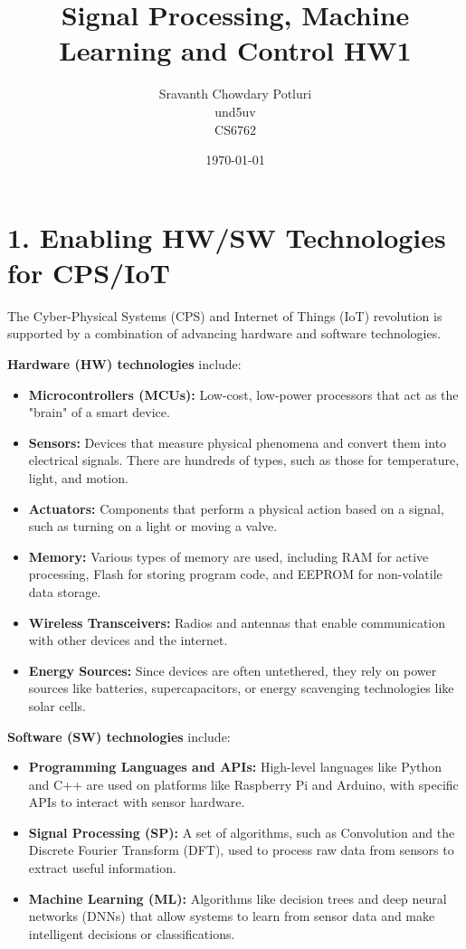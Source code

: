 \documentclass[a4paper,12pt]{article}
\title{Signal Processing, Machine Learning and Control HW1}
\author{Sravanth Chowdary Potluri \\ und5uv \\ CS6762}
\date{\today}
\begin{document}
\maketitle

\section*{1. Enabling HW/SW Technologies for CPS/IoT}

The Cyber-Physical Systems (CPS) and Internet of Things (IoT) revolution is supported by a combination of advancing hardware and software technologies. 

\textbf{Hardware (HW) technologies} include:
\begin{itemize}
    \item \textbf{Microcontrollers (MCUs):} Low-cost, low-power processors that act as the "brain" of a smart device.
    \item \textbf{Sensors:} Devices that measure physical phenomena and convert them into electrical signals. There are hundreds of types, such as those for temperature, light, and motion.
    \item \textbf{Actuators:} Components that perform a physical action based on a signal, such as turning on a light or moving a valve.
    \item \textbf{Memory:} Various types of memory are used, including RAM for active processing, Flash for storing program code, and EEPROM for non-volatile data storage.
    \item \textbf{Wireless Transceivers:} Radios and antennas that enable communication with other devices and the internet.
    \item \textbf{Energy Sources:} Since devices are often untethered, they rely on power sources like batteries, supercapacitors, or energy scavenging technologies like solar cells.
\end{itemize}

\textbf{Software (SW) technologies} include:
\begin{itemize}
    \item \textbf{Programming Languages and APIs:} High-level languages like Python and C++ are used on platforms like Raspberry Pi and Arduino, with specific APIs to interact with sensor hardware.
    \item \textbf{Signal Processing (SP):} A set of algorithms, such as Convolution and the Discrete Fourier Transform (DFT), used to process raw data from sensors to extract useful information.
    \item \textbf{Machine Learning (ML):} Algorithms like decision trees and deep neural networks (DNNs) that allow systems to learn from sensor data and make intelligent decisions or classifications.
\end{itemize}
\end{document}
